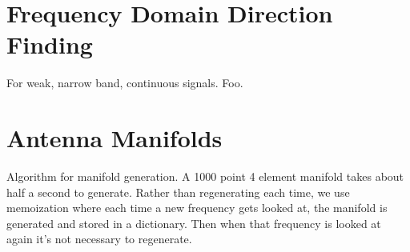 \section{Frequency Domain Direction Finding}
For weak, narrow band, continuous signals.
Foo.

\section{Antenna Manifolds}
Algorithm for manifold generation.
A 1000 point 4 element manifold takes about half a second to generate.
Rather than regenerating each time, we use memoization where each time a new frequency gets looked at, the manifold is generated and stored in a dictionary. Then when that frequency is looked at again it's not necessary to regenerate.
